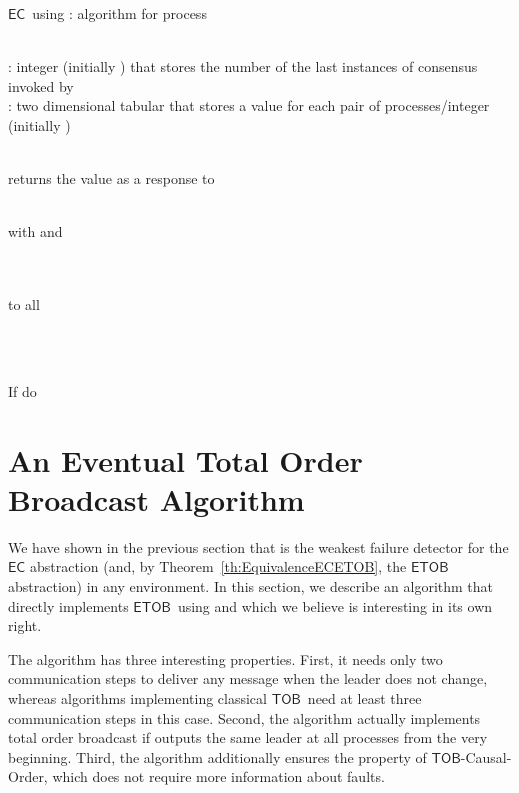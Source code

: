 \documentclass[11pt]{article}
\newcommand{\EC}{\ensuremath{\mathsf{EC}}}
\newcommand{\ETOB}{\ensuremath{\mathsf{ETOB}}}
\newcommand{\TOB}{\ensuremath{\mathsf{TOB}}}
\begin{document}
\begin{algorithm}
\caption{\EC~using : algorithm for process }\label{algo:EC}
\small
\begin{description}\itemsep0pt
\item[Local variables:]~\\
: integer (initially ) that stores the number of the last instances of consensus invoked by \\
: two dimensional tabular that stores a value for each pair of processes/integer (initially )

\item[Functions:]~\\
 returns the value  as a response to 

\item[Messages:]~\\
 with  and 

\item[On invocation of ]~\\
\\
  to all

\item[On reception of  from ]~\\


\item[On local time out]~\\
If  do\\


\end{description}
\normalsize
\end{algorithm}



\section{An Eventual Total Order Broadcast Algorithm}
\label{sec:ETOB}

We have shown in the previous section that  is the weakest
failure detector for the {\EC} abstraction (and, by Theorem~\ref{th:EquivalenceECETOB}, the
{\ETOB} abstraction) in any environment.
In this section, we describe an algorithm that directly implements \ETOB~using
 and which we believe is interesting in its own right. 

The algorithm has  three interesting properties.   First, it
needs only two communication steps to deliver any message when the leader does not change,  whereas algorithms implementing
classical \TOB~need at least three communication steps in this case.
Second,  the algorithm actually implements total order broadcast if
 outputs the same leader at all processes from the very beginning.
Third, the algorithm additionally ensures the property of  \TOB-Causal-Order,
which does not require more information about faults.
\end{document}
